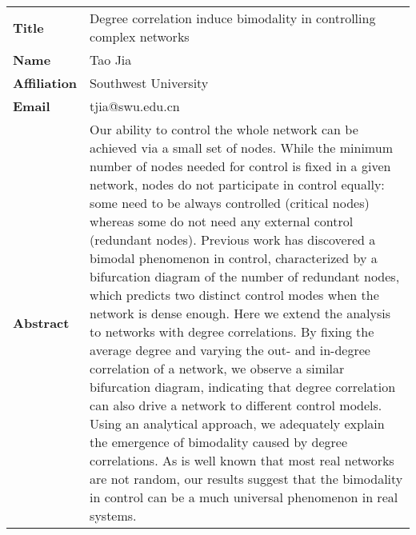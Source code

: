 \documentclass[oneside,A4paper,12pt]{article}
\begin{document}
\newpage
\begin{longtable}{p{2cm}p{14cm}}
\toprule
\textbf{Title} & Degree correlation induce bimodality in controlling complex networks\\
\textbf{Name} & Tao Jia\\
\textbf{Affiliation} & Southwest University\\
\textbf{Email} & tjia@swu.edu.cn\\
\textbf{Abstract} & Our ability to control the whole network can be achieved via a small set of nodes. While the minimum number of nodes needed for control is fixed in a given network, nodes do not participate in control equally: some need to be always controlled (critical nodes) whereas some do not need any external control (redundant nodes). Previous work has discovered a bimodal phenomenon in control, characterized by a bifurcation diagram of the number of redundant nodes, which predicts two distinct control modes when the network is dense enough. Here we extend the analysis to networks with degree correlations. By fixing the average degree and varying the out- and in-degree correlation of a network, we observe a similar bifurcation diagram, indicating that degree correlation can also drive a network to different control models. Using an analytical approach, we adequately explain the emergence of bimodality caused by degree correlations. As is well known that most real networks are not random, our results suggest that the bimodality in control can be a much universal phenomenon in real systems.\\
\bottomrule
\end{longtable}
\end{document}
